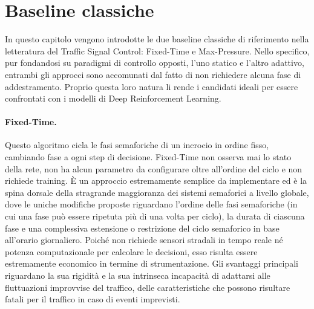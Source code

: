\section{Baseline classiche}
\label{sec:baseline}

In questo capitolo vengono introdotte le due baseline classiche di riferimento nella letteratura del Traffic Signal Control: Fixed-Time e Max-Pressure.
Nello specifico, pur fondandosi su paradigmi di controllo opposti, l'uno statico e l'altro adattivo, entrambi gli approcci sono accomunati dal fatto di non richiedere alcuna fase di addestramento.
Proprio questa loro natura li rende i candidati ideali per essere confrontati con i modelli di Deep Reinforcement Learning.

\paragraph{Fixed-Time.}
Questo algoritmo cicla le fasi semaforiche di un incrocio in ordine fisso,
cambiando fase a ogni step di decisione. Fixed-Time non osserva mai lo stato
della rete, non ha alcun parametro da configurare oltre all'ordine del
ciclo e non richiede training.
È un approccio estremamente semplice da implementare ed è la spina dorsale della stragrande maggioranza dei sistemi semaforici a livello globale,
dove le uniche modifiche proposte riguardano l'ordine delle fasi semaforiche (in cui una fase può essere ripetuta più di una volta per ciclo),
la durata di ciascuna fase e una complessiva estensione o restrizione del ciclo semaforico in base all'orario giornaliero.
Poiché non richiede sensori stradali in tempo reale né potenza computazionale per calcolare le decisioni, esso risulta essere estremamente economico in termine di strumentazione.
Gli svantaggi principali riguardano la sua rigidità e la sua intrinseca incapacità di adattarsi alle fluttuazioni improvvise del traffico,
delle caratteristiche che possono risultare fatali per il traffico in caso di eventi imprevisti.

